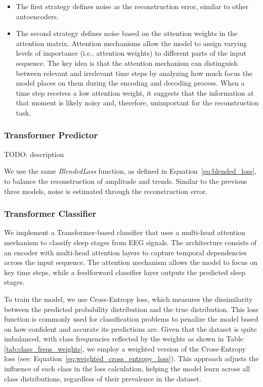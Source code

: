 \begin{itemize}
    \item The first strategy defines noise as the reconstruction error, similar to other autoencoders.
    \vspace{-0.2cm}
    \item The second strategy defines noise based on the attention weights in the attention matrix. Attention mechanisms allow the model to assign varying levels of importance (i.e., attention weights) to different parts of the input sequence. The key idea is that the attention mechanism can distinguish between relevant and irrelevant time steps by analyzing how much focus the model places on them during the encoding and decoding process. When a time step receives a low attention weight, it suggests that the information at that moment is likely noisy and, therefore, unimportant for the reconstruction task.
\end{itemize}

\subsubsection{Transformer Predictor}
TODO: description

We use the same \emph{BlendedLoss} function, as defined in Equation~\ref{eq:blended_loss}, to balance the reconstruction of amplitude and trends. Similar to the previous three models, noise is estimated through the reconstruction error.

\subsubsection{Transformer Classifier}
We implement a Transformer-based classifier that uses a multi-head attention mechanism to classify sleep stages from EEG signals. The architecture consists of an encoder with multi-head attention layers to capture temporal dependencies across the input sequence. The attention mechanism allows the model to focus on key time steps, while a feedforward classifier layer outputs the predicted sleep stages.

To train the model, we use Cross-Entropy loss, which measures the dissimilarity between the predicted probability distribution and the true distribution. This loss function is commonly used for classification problems to penalize the model based on how confident and accurate its predictions are. Given that the dataset is quite imbalanced, with class frequencies reflected by the weights as shown in Table \ref{tab:class_freqs_weights}, we employ a weighted version of the Cross-Entropy loss (see: Equation~\ref{eq:weighted_cross_entropy_loss}). This approach adjusts the influence of each class in the loss calculation, helping the model learn across all class distributions, regardless of their prevalence in the dataset.

